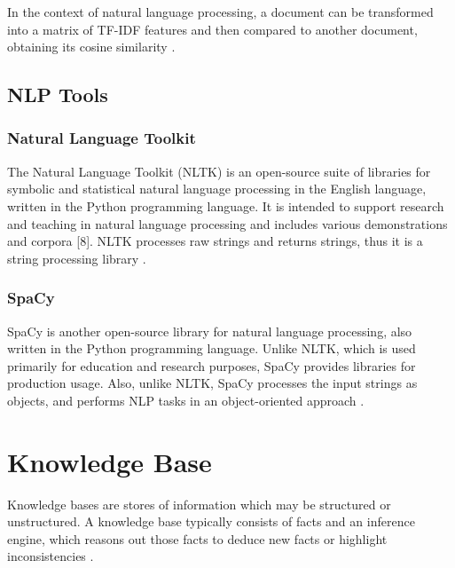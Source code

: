 \documentclass[10pt,11pt,12pt,oneside]{book}
\begin{document}
	In the context of natural language processing, a document can be transformed into a matrix of TF-IDF features and then compared to another document, obtaining its cosine similarity \cite{huang}.
	
	\subsection{NLP Tools}
	
		\subsubsection{Natural Language Toolkit}
		The Natural Language Toolkit (NLTK) is an open-source suite of libraries for symbolic and statistical natural language processing in the English language, written in the Python programming language. It is intended to support research and teaching in natural language processing and includes various demonstrations and corpora [8]. NLTK processes raw strings and returns strings, thus it is a string processing library \cite {aho_lam_sethi_ullman_2006}.
		
		\subsubsection{SpaCy}
		SpaCy is another open-source library for natural language processing, also written in the Python programming language. Unlike NLTK, which is used primarily for education and research purposes, SpaCy provides libraries for production usage. Also, unlike NLTK, SpaCy processes the input strings as objects, and performs NLP tasks in an object-oriented approach \cite {aho_lam_sethi_ullman_2006}.
	
	
	
	\section{Knowledge Base}
	Knowledge bases are stores of information which may be structured or unstructured. A knowledge base typically consists of facts and an inference engine, which reasons out those facts to deduce new facts or highlight inconsistencies \cite {scholl_2016}.\\
	
\end{document}
